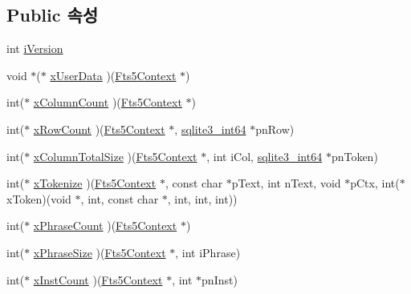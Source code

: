 \subsection*{Public 속성}
\begin{DoxyCompactItemize}
\item 
int \hyperlink{struct_fts5_extension_api_af9c8f09c2e6f1373e6bce57ec9861682}{i\+Version}
\item 
void $\ast$($\ast$ \hyperlink{struct_fts5_extension_api_a8e651288d8e0cf25f20f2b838f47ac34}{x\+User\+Data} )(\hyperlink{sqlite3_8h_a97821b95ebebd43db901977ffd5b26bc}{Fts5\+Context} $\ast$)
\item 
int($\ast$ \hyperlink{struct_fts5_extension_api_a427409c50da4e179c8f2d36b22a4ba21}{x\+Column\+Count} )(\hyperlink{sqlite3_8h_a97821b95ebebd43db901977ffd5b26bc}{Fts5\+Context} $\ast$)
\item 
int($\ast$ \hyperlink{struct_fts5_extension_api_ae1eb7ad1d3c131a09376134ecc099568}{x\+Row\+Count} )(\hyperlink{sqlite3_8h_a97821b95ebebd43db901977ffd5b26bc}{Fts5\+Context} $\ast$, \hyperlink{sqlite3_8h_a0a4d3e6c1ad46f90e746b920ab6ca0d2}{sqlite3\+\_\+int64} $\ast$pn\+Row)
\item 
int($\ast$ \hyperlink{struct_fts5_extension_api_a096e79406ae03df9796a2082d0ac8269}{x\+Column\+Total\+Size} )(\hyperlink{sqlite3_8h_a97821b95ebebd43db901977ffd5b26bc}{Fts5\+Context} $\ast$, int i\+Col, \hyperlink{sqlite3_8h_a0a4d3e6c1ad46f90e746b920ab6ca0d2}{sqlite3\+\_\+int64} $\ast$pn\+Token)
\item 
int($\ast$ \hyperlink{struct_fts5_extension_api_a670af0d7715f69834376f8df187dcf30}{x\+Tokenize} )(\hyperlink{sqlite3_8h_a97821b95ebebd43db901977ffd5b26bc}{Fts5\+Context} $\ast$, const char $\ast$p\+Text, int n\+Text, void $\ast$p\+Ctx, int($\ast$x\+Token)(void $\ast$, int, const char $\ast$, int, int, int))
\item 
int($\ast$ \hyperlink{struct_fts5_extension_api_a3ba0207080a9ca498625eefcc120bf1e}{x\+Phrase\+Count} )(\hyperlink{sqlite3_8h_a97821b95ebebd43db901977ffd5b26bc}{Fts5\+Context} $\ast$)
\item 
int($\ast$ \hyperlink{struct_fts5_extension_api_aeda6faa66f47f9116c9ceba882aaedd2}{x\+Phrase\+Size} )(\hyperlink{sqlite3_8h_a97821b95ebebd43db901977ffd5b26bc}{Fts5\+Context} $\ast$, int i\+Phrase)
\item 
int($\ast$ \hyperlink{struct_fts5_extension_api_af57aff7a8aa8402bb37a77892c4daf45}{x\+Inst\+Count} )(\hyperlink{sqlite3_8h_a97821b95ebebd43db901977ffd5b26bc}{Fts5\+Context} $\ast$, int $\ast$pn\+Inst)
\item 

\end{DoxyCompactItemize}
